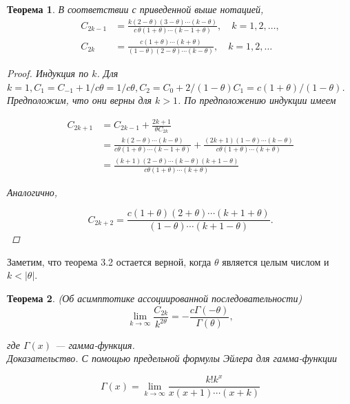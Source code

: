 \documentclass[14pt, a4paper]{extarticle}
\newtheorem{theorem}{Теорема}[section] %
\theoremstyle{definition}
\theoremstyle{remark}
\begin{document}
\begin{theorem}
В соответствии с приведенной выше нотацией,
\begin{subequations}
\begin{align}
C_{2k-1} &= \frac{k (2 - \theta) (3 - \theta) \cdots (k - \theta)}{c \, \theta (1 + \theta) \cdots (k - 1 + \theta)}, \quad k = 1, 2, \dots, \\
C_{2k} &= \frac{c (1 + \theta) \cdots (k + \theta)}{(1 - \theta) (2 - \theta) \cdots (k - \theta)}, \quad k = 1, 2, \dots
\end{align}
\end{subequations}

\begin{proof}
Индукция по $k$. Для $k=1, C_{1}=C_{-1}+1 / c \theta=1 / c \theta, C_{2}=C_{0}+2 /(1-\theta) C_{1}= c(1+\theta) /(1-\theta)$. Предположим, что они верны для $k>1$. По предположению индукции имеем

\begin{subequations}
\begin{align}
C_{2 k+1} & =C_{2 k-1}+\frac{2 k+1}{\theta C_{2 k}} \\
& =\frac{k(2-\theta) \cdots(k-\theta)}{c \theta(1+\theta) \cdots(k-1+\theta)}+\frac{(2 k+1)(1-\theta) \cdots(k-\theta)}{c \theta(1+\theta) \cdots(k+\theta)} \\
& =\frac{(k+1)(2-\theta) \cdots(k-\theta)(k+1-\theta)}{c \theta(1+\theta) \cdots(k+\theta)} 
\end{align}
\end{subequations}


Аналогично,


\begin{equation}
C_{2 k+2}=\frac{c(1+\theta)(2+\theta) \cdots(k+1+\theta)}{(1-\theta) \cdots(k+1-\theta)} .
\end{equation}

\end{proof}

\end{theorem}

Заметим, что теорема 3.2 остается верной, когда $\theta$ является целым числом и $k<|\theta|$.\\
\begin{theorem}(Об асимптотике ассоциированной последовательности)
\begin{equation}
\lim _{k \rightarrow \infty} \frac{C_{2 k}}{k^{2 \theta}}=-\frac{c \Gamma(-\theta)} {\Gamma(\theta)},
\end{equation}


где $\Gamma(x)$ — гамма-функция.\\
Доказательство. С помощью предельной формулы Эйлера для гамма-функции


\begin{equation}
\Gamma(x)=\lim _{k \rightarrow \infty} \frac{k!k^{x}}{x(x+1) \cdots(x+k)}
\end{equation}




\end{theorem}
\end{document}
